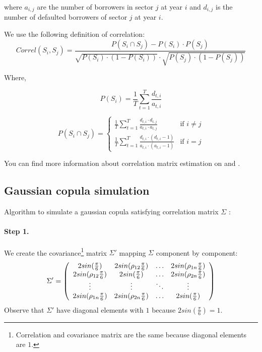 \documentclass[a4paper,12pt,final]{article}
\begin{document}
where $a_{i,j}$ are the number of borrowers in sector $j$ at year $i$ and
$d_{i,j}$ is the number of defaulted borrowers of sector $j$ at year $i$.
\newline

We use the following definition of correlation:
\begin{displaymath}
Correl(S_i,S_j) = \frac{P(S_i \cap S_j) - P(S_i) \cdot P(S_j)}{\sqrt{P(S_i) \cdot (1-P(S_i))} \cdot \sqrt{P(S_j) \cdot (1-P(S_j))}}
\end{displaymath}

Where,

\begin{displaymath}
P(S_i) = \frac{1}{T} \sum_{t=1}^{T} \frac{d_{t,i}}{a_{t,i}}
\end{displaymath}

\begin{displaymath}
P(S_i \cap S_j) = \left\{
\begin{array}{ll}
\frac{1}{T} \sum_{t=1}^{T} \frac{d_{t,i} \cdot d_{t,j}}{a_{t,i} \cdot a_{t,j}} & \textrm{if  } i \neq j \\
\frac{1}{T} \sum_{t=1}^{T} \frac{d_{t,i} \cdot (d_{t,i}-1)}{a_{t,i} \cdot (a_{t,i}-1)} & \textrm{if  } i = j
\end{array}
\right.
\end{displaymath}

You can find more information about correlation matrix estimation on 
\cite{correlations:ubs} and \cite{correlations:cmetrics}.

\subsection{Gaussian copula simulation}
\label{ap:gaussiancopu}
Algorithm to simulate a gaussian copula satisfying correlation matrix $\Sigma$ 
\cite{copu:wang} \cite{copu:pricing}:

\paragraph{Step 1.} We create the covariance\footnote{Correlation and covariance 
matrix are the same because diagonal elements are $1$.} matrix $\Sigma'$ mapping 
$\Sigma$ component by component:
\begin{displaymath}
\Sigma' = \left( 
\begin{array}{cccc}
2 sin(\frac{\pi}{6})           & 2 sin(\rho_{12} \frac{\pi}{6}) & \ldots & 2 sin(\rho_{1n} \frac{\pi}{6})\cr
2 sin(\rho_{12} \frac{\pi}{6}) & 2 sin(\frac{\pi}{6})           & \ldots & 2 sin(\rho_{2n} \frac{\pi}{6})\cr
\vdots                         & \vdots                         & \ddots  & \vdots   \cr
2 sin(\rho_{1n} \frac{\pi}{6}) & 2 sin(\rho_{2n} \frac{\pi}{6}) & \ldots & 2 sin(\frac{\pi}{6})
\end{array}
\right)
\end{displaymath}
Observe that $\Sigma'$ have diagonal elements with $1$ because $2 sin(\frac{\pi}{6}) = 1$.
\end{document}
